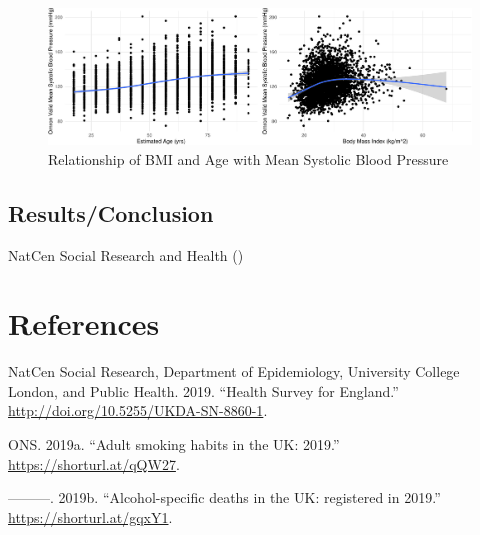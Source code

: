 \documentclass[
  11pt,
]{article}
\newlength{\cslhangindent}
\newenvironment{CSLReferences}[2] %
 {\begin{list}{}{%
  \setlength{\itemindent}{0pt}
  \setlength{\leftmargin}{0pt}
  \setlength{\parsep}{0pt}
  \ifodd #1
   \setlength{\leftmargin}{\cslhangindent}
   \setlength{\itemindent}{-1\cslhangindent}
  \fi
  \setlength{\itemsep}{#2\baselineskip}}}
 {\end{list}}
\begin{document}
\begin{figure}[H]
\includegraphics{Coursework_files/figure-latex/output relationship plots-1} \caption{Relationship of BMI and Age with Mean Systolic Blood Pressure}\label{fig:output relationship plots}
\end{figure}

\subsection{Results/Conclusion}\label{resultsconclusion}

NatCen Social Research and Health ()

\newpage

\section*{References}\label{references}

\label{refs}
\begin{CSLReferences}{1}{0}
NatCen Social Research, Department of Epidemiology, University College
London, and Public Health. 2019. {``{Health Survey for England}.''}
\url{http://doi.org/10.5255/UKDA-SN-8860-1}.

ONS. 2019a. {``{Adult smoking habits in the UK: 2019}.''}
\url{https://shorturl.at/qQW27}.

---------. 2019b. {``{Alcohol-specific deaths in the UK: registered in
2019}.''} \url{https://shorturl.at/gqxY1}.

\end{CSLReferences}
\end{document}
